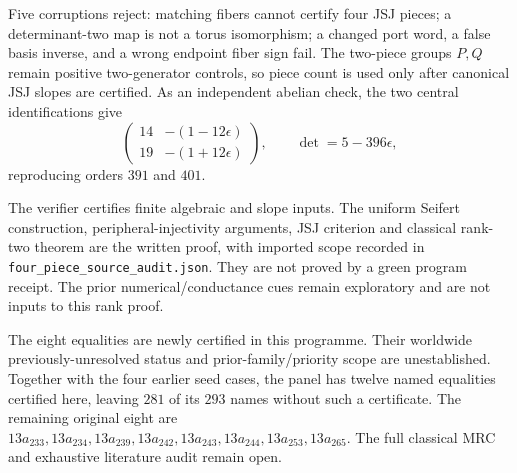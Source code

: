 \documentclass[11pt]{article}
\begin{document}
Five corruptions reject: matching fibers cannot certify four JSJ pieces;
a determinant-two map is not a torus isomorphism; a changed port word,
a false basis inverse, and a wrong endpoint fiber sign fail. The
two-piece groups $P,Q$ remain positive two-generator controls, so piece
count is used only after canonical JSJ slopes are certified. As an
independent abelian check, the two central identifications give
\[
 \begin{pmatrix}14&-(1-12\epsilon)\\19&-(1+12\epsilon)\end{pmatrix},
 \qquad \det=5-396\epsilon,
\]
reproducing orders $391$ and $401$.

The verifier certifies finite algebraic and slope inputs. The uniform
Seifert construction, peripheral-injectivity arguments, JSJ criterion
and classical rank-two theorem are the written proof, with imported
scope recorded in \texttt{four\_piece\_source\_audit.json}. They are
not proved by a green program receipt. The prior numerical/conductance
cues remain exploratory and are not inputs to this rank proof.

The eight equalities are newly certified in this programme. Their
worldwide previously-unresolved status and prior-family/priority scope
are unestablished. Together with the four earlier seed cases, the panel
has twelve named equalities certified here, leaving $281$ of its $293$
names without such a certificate. The remaining original eight are
$13a_{233},13a_{234},13a_{239},13a_{242},13a_{243},13a_{244},13a_{253},13a_{265}$.
The full classical MRC and exhaustive literature audit remain open.
\end{document}
